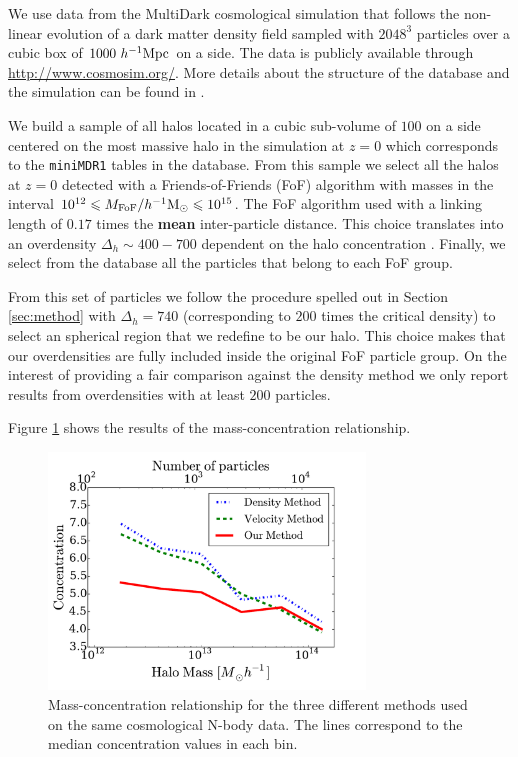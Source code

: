 \documentclass[a4,useAMS,usenatbib,usegraphicx]{mn2e}
\newcommand{\hMpc}{{\ifmmode{h^{-1}{\rm Mpc}}\else{$h^{-1}$Mpc}\fi}}
\newcommand{\hMsun}{{\ifmmode{h^{-1}{\rm {M_{\odot}}}}\else{$h^{-1}{\rm{M_{\odot}}}$}\fi}}
\begin{document}
We use data from the MultiDark cosmological simulation that follows
the non-linear evolution of a dark matter density field sampled with
$2048^3$ particles over a cubic box of $1000\ \hMpc$ on a side.  The
data is publicly available through \url{http://www.cosmosim.org/}.
More details about the structure of the database and the simulation
can be found in \citep{2013AN....334..691R}.

We build a sample of all halos located in a cubic sub-volume of $100$
\hMpc on a side centered on the most massive halo in the simulation at
$z=0$ which corresponds to the \texttt{miniMDR1} tables in the
database.  From this sample we select all the halos at $z=0$ detected
with a Friends-of-Friends (FoF) algorithm with masses in the interval
$10^{12}\leq M_{\rm FoF}/\hMsun \leq 10^{15}$.  The FoF algorithm used
with a linking length of $0.17$ times the {\bf mean} inter-particle
distance. This choice translates into an overdensity $\Delta_h\sim
400-700$ dependent on the halo concentration \citep{More2011}.
Finally, we select from the database all the particles that belong to
each FoF group.

From this set of particles we follow the procedure spelled out in
Section \ref{sec:method} with $\Delta_h=740$ (corresponding to $200$
times the critical density) to select an spherical region that we
redefine to be our halo.  This choice makes that our overdensities are
fully included inside the original FoF particle group.  On the
interest of providing a fair comparison against the density method we
only report results from overdensities with at least $200$ particles.

Figure \ref{fig:concentration} shows the results of the
mass-concentration relationship.

\begin{figure}
\begin{center}
  \includegraphics[width=0.75\textwidth]{concentration.pdf}
\end{center}
\caption{Mass-concentration relationship for the three different
  methods used on the same cosmological N-body data. 
  The lines correspond to the median concentration values in each bin.
  \label{fig:concentration}}
\end{figure}
\end{document}
